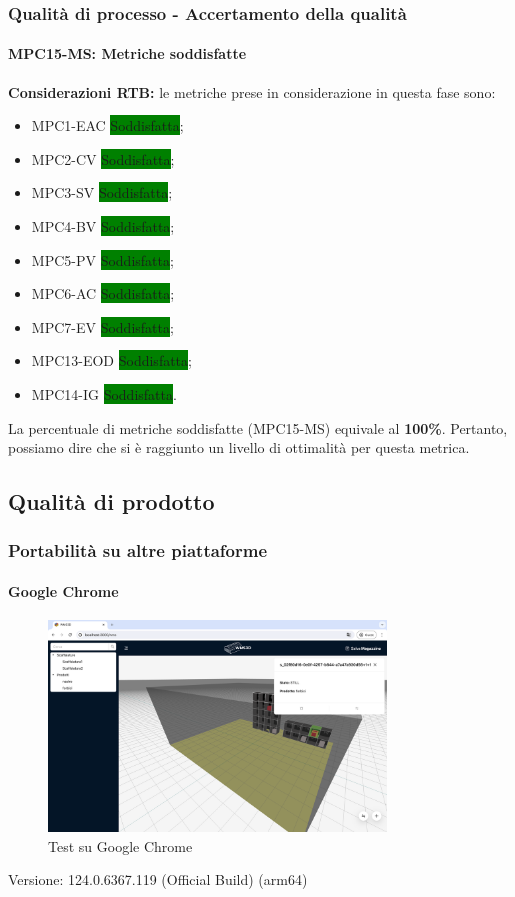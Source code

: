\subsubsection{Qualità di processo - Accertamento della qualità}
\paragraph{MPC15-MS: Metriche soddisfatte} \label{sec:accertamento delle qualita}
\noindent \textbf{Considerazioni RTB:}
le metriche prese in considerazione in questa fase sono:
\begin{itemize}
    \item MPC1-EAC \colorbox{green}{Soddisfatta};
    \item MPC2-CV \colorbox{green}{Soddisfatta};
    \item MPC3-SV \colorbox{green}{Soddisfatta};
    \item MPC4-BV \colorbox{green}{Soddisfatta};
    \item MPC5-PV \colorbox{green}{Soddisfatta};
    \item MPC6-AC \colorbox{green}{Soddisfatta};
    \item MPC7-EV \colorbox{green}{Soddisfatta};
    \item MPC13-EOD \colorbox{green}{Soddisfatta};
    \item MPC14-IG \colorbox{green}{Soddisfatta}.
\end{itemize}
\noindent La percentuale di metriche soddisfatte (MPC15-MS) equivale al \textbf{100\%}. Pertanto, possiamo dire che si è raggiunto un livello di ottimalità per questa metrica.

\newpage
\subsection{Qualità di prodotto}
\subsubsection{Portabilità su altre piattaforme}
\paragraph{Google Chrome}
\begin{figure}[h!] 
    \centering
    \includegraphics[width=0.8\textwidth]{images/chrome.png}
    \caption{Test su Google Chrome}
\end{figure}
Versione: 124.0.6367.119 (Official Build) (arm64)

